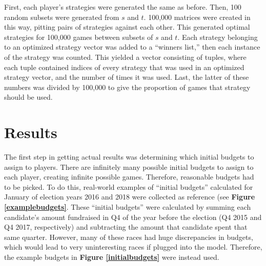 \documentclass[11pt]{article}
\begin{document}
First, each player's strategies were generated the same as before. Then, 100
random subsets were generated from $s$ and $t$. 100,000 matrices were created
in this way, pitting pairs of strategies against each other. This generated
optimal strategies for 100,000 games between subsets of $s$ and $t$. Each
strategy belonging to an optimized strategy vector was added to a ``winners list,'' then each instance of the
strategy was counted. This yielded a vector consisting of tuples, where each tuple contained indices of every strategy that was used in an optimized strategy vector, and the number of times it was used. Last, the latter of these numbers was divided by 100,000 to give the proportion of games that strategy should be used. 
\newpage
\section{Results}
The first step in getting actual results was determining which initial budgets
to assign to players. There are infinitely many possible initial budgets to
assign to each player, creating infinite possible games. Therefore, reasonable
budgets had to be picked. To do this, real-world examples of ``initial
budgets'' calculated for January of election years 2016 and 2018 were collected
as reference (see \textbf{Figure \ref{examplebudgets}}. These ``initial
budgets'' were calculated by summing each candidate's amount fundraised in Q4
of the year before the election (Q4 2015 and Q4 2017, respectively) and
subtracting the amount that candidate spent that same quarter. However, many of
these races had huge discrepancies in budgets, which would lead to very
uninteresting races if plugged into the model. Therefore, the example budgets
in \textbf{Figure \ref{initialbudgets}} were instead used. 
\end{document}
